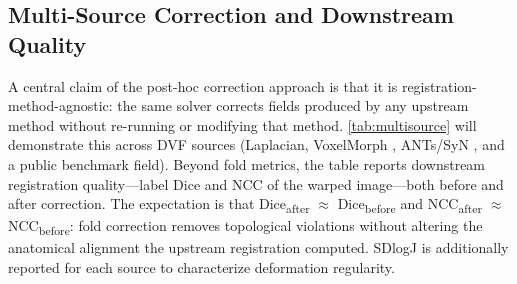 \subsection{Multi-Source Correction and Downstream Quality}
\label{sec:multisource}

A central claim of the post-hoc correction approach is that it is registration-method-agnostic: the same solver corrects fields produced by any upstream method without re-running or modifying that method. \autoref{tab:multisource} will demonstrate this across DVF sources (Laplacian, VoxelMorph \cite{VoxelMorph2019}, ANTs/SyN \cite{AVANTS200826}, and a public benchmark field). Beyond fold metrics, the table reports downstream registration quality—label Dice and NCC of the warped image—both before and after correction. The expectation is that Dice\textsubscript{after} $\approx$ Dice\textsubscript{before} and NCC\textsubscript{after} $\approx$ NCC\textsubscript{before}: fold correction removes topological violations without altering the anatomical alignment the upstream registration computed. SDlogJ is additionally reported for each source to characterize deformation regularity.

\begin{table}[ht]\centering
\caption{TODO (deferred result): Multi-source correction results. Rows are DVF sources (Laplacian, VoxelMorph, ANTs/SyN, public benchmark). Columns: geometric feasibility, L1 deviation, \%$J{\leq}0$ before/after, SDlogJ before/after, label Dice before/after, NCC before/after.}
\label{tab:multisource}
\end{table}

